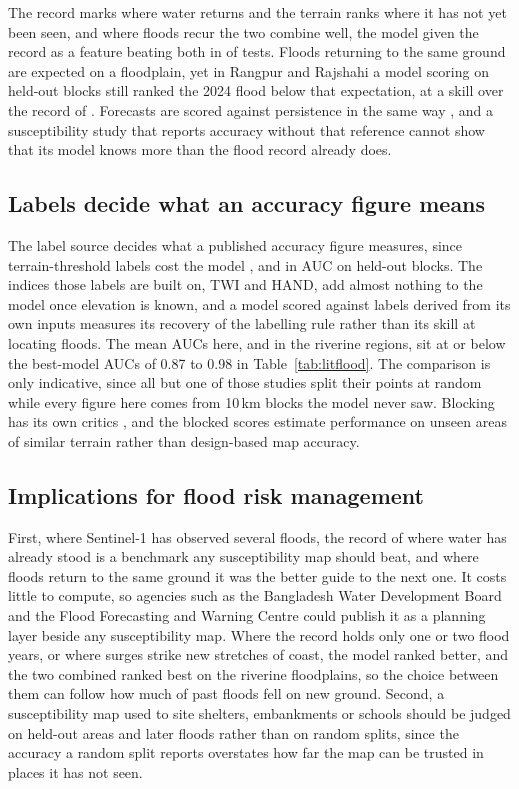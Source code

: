 \documentclass[10pt,a4paper,twocolumn]{article}
\begin{document}
The record marks where water returns and the terrain ranks where it has not yet been seen, and where floods recur the two combine well, the model given the record as a feature beating both in \CombinedAheadBoth{} of \CombinedTests{} tests. Floods returning to the same ground are expected on a floodplain, yet in Rangpur and Rajshahi a model scoring \RRBenchBoostingAUC{} on held-out blocks still ranked the 2024 flood below that expectation, at a skill over the record of \RRSkillModel{}. Forecasts are scored against persistence in the same way \citep{murphy1988, pappenberger2015}, and a susceptibility study that reports accuracy without that reference cannot show that its model knows more than the flood record already does.

\subsection{Labels decide what an accuracy figure means}

The label source decides what a published accuracy figure measures, since terrain-threshold labels cost the model \RRLabelGap{}, \SylhetLabelGap{} and \CoastalLabelGap{} in AUC on held-out blocks. The indices those labels are built on, TWI and HAND, add almost nothing to the model once elevation is known, and a model scored against labels derived from its own inputs measures its recovery of the labelling rule rather than its skill at locating floods. The mean AUCs here, \RRBenchBoostingAUC{} and \SylhetBenchBoostingAUC{} in the riverine regions, sit at or below the best-model AUCs of 0.87 to 0.98 in Table~\ref{tab:litflood}. The comparison is only indicative, since all but one of those studies split their points at random while every figure here comes from 10\,km blocks the model never saw. Blocking has its own critics \citep{roberts2017, wadoux2021}, and the blocked scores estimate performance on unseen areas of similar terrain rather than design-based map accuracy.

\subsection{Implications for flood risk management}
\label{sec:implications}

First, where Sentinel-1 has observed several floods, the record of where water has already stood is a benchmark any susceptibility map should beat, and where floods return to the same ground it was the better guide to the next one. It costs little to compute, so agencies such as the Bangladesh Water Development Board and the Flood Forecasting and Warning Centre could publish it as a planning layer beside any susceptibility map. Where the record holds only one or two flood years, or where surges strike new stretches of coast, the model ranked better, and the two combined ranked best on the riverine floodplains, so the choice between them can follow how much of past floods fell on new ground. Second, a susceptibility map used to site shelters, embankments or schools should be judged on held-out areas and later floods rather than on random splits, since the accuracy a random split reports overstates how far the map can be trusted in places it has not seen.
\end{document}
